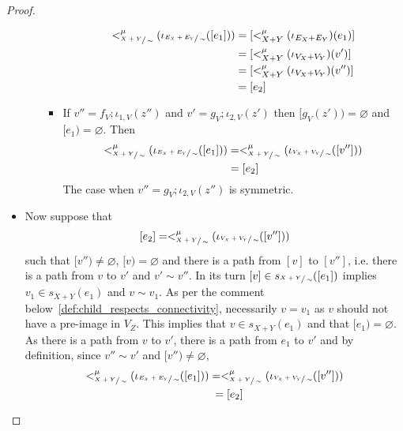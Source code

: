 \begin{proof}
\begin{itemize}
\begin{itemize}
\begin{itemize}
                            \begin{align*}
                                    <_{\sfrac{X+Y}{\sim}}^{\mu}(\iota_{\sfrac{E_{X} + E_{Y}}{\sim}}([e_1])) &= [<_{X+Y}^{\mu}(\iota_{E_{X} + E_{Y}})(e_1)]\\
                                                                                                    &= [<_{X+Y}^{\mu}(\iota_{V_{X} + V_{Y}})(v')]\\
                                                                                                    &= [<_{X+Y}^{\mu}(\iota_{V_{X} + V_{Y}})(v'')]\\
                                                                                                    &= [e_2]
                                  \end{align*}
                        \item If $v'' = f_{V};\iota_{1,V}(z'')$ and $v' = g_{V};\iota_{2,V}(z')$ then $[g_{V}(z')) = \varnothing$ and $[e_1) = \varnothing$. 
                        Then
                        \begin{align*}
                            <_{\sfrac{X+Y}{\sim}}^{\mu}(\iota_{\sfrac{E_{X} + E_{Y}}{\sim}}([e_1])) &= <_{\sfrac{X+Y}{\sim}}^{\mu}(\iota_{\sfrac{V_{X} + V_{Y}}{\sim}}([v'']))\\
                                                                                                    &= [e_2]
                        \end{align*}
                        The case when $v'' = g_{V};\iota_{2,V}(z'')$ is symmetric.
                    \end{itemize}
                \end{itemize}
                \item Now suppose that 
                \[
                [e_2] = <_{\sfrac{X+Y}{\sim}}^{\mu}(\iota_{\sfrac{V_{X} + V_{Y}}{\sim}}([v'']))
                \]
                such that $[v'') \not = \varnothing$, $[v) = \varnothing$ and there is a path from $[v]$ to $[v'']$, i.e. there is a path from $v$ to $v'$ and $v' \sim v''$.
                In its turn $[v] \in s_{\sfrac{X + Y}{\sim}}([e_1])$ implies $v_1 \in s_{X+Y}(e_1)$ and $v \sim v_1$.
                As per the comment below~\ref{def:child_respects_connectivity}, necessarily $v = v_1$ as $v$ should not have a pre-image in $V_{Z}$.
                This implies that $v \in s_{X+Y}(e_1)$ and that $[e_1) = \varnothing$.
                As there is a path from $v$ to $v'$, there is a path from $e_1$ to $v'$ and by definition, since $v'' \sim v'$ and $[v'') \not = \varnothing$,
                \begin{align*}
                <_{\sfrac{X+Y}{\sim}}^{\mu}(\iota_{\sfrac{E_{X} + E_{Y}}{\sim}}([e_1])) &= <_{\sfrac{X+Y}{\sim}}^{\mu}(\iota_{\sfrac{V_{X} + V_{Y}}{\sim}}([v'']))\\
                 &\;= [e_2]
                \end{align*}
            \end{itemize}    
\end{proof}


